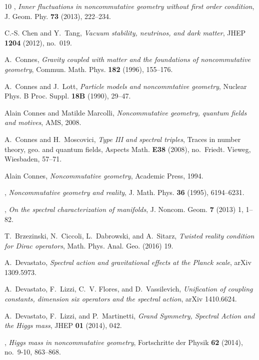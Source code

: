 \documentclass[11pt]{article}
\begin{document}
\begin{thebibliography}{10}
\bysame, \emph{{I}nner fluctuations in noncommutative geometry without first
  order condition}, J. Geom. Phy. \textbf{73} (2013), 222--234.


C.-S. Chen and Y.~Tang, \emph{Vacuum stability, neutrinos, and dark matter},
  JHEP \textbf{1204} (2012), no.~019.

A.~Connes, \emph{Gravity coupled with matter and the foundations of
  noncommutative geometry}, Commun. Math. Phys. \textbf{182} (1996), 155--176.

A.~Connes and J.~Lott, \emph{Particle models and noncommtative geometry},
  Nuclear Phys. B Proc. Suppl. \textbf{18B} (1990), 29--47.

Alain Connes and Matilde Marcolli, \emph{Noncommutative geometry, quantum
  fields and motives}, AMS, 2008.

A.~Connes and H.~Moscovici, \emph{Type {III} and spectral triples}, Traces in
  number theory, geo. and quantum fields, Aspects Math. \textbf{E38}
  (2008), no.~Friedt. Vieweg, Wiesbaden, 57--71.

Alain Connes, \emph{Noncommutative geometry}, Academic Press, 1994.

\bysame, \emph{Noncommutative geometry and reality}, J. Math. Phys. \textbf{36}
  (1995), 6194--6231.

\bysame, \emph{On the spectral characterization of manifolds}, J. Noncom. Geom.
  \textbf{7} (2013) 1, 1--82.

T.~Brzezinski, N.~Ciccoli, L.~Dabrowski, and A.~Sitarz, \emph{Twisted reality
  condition for {D}irac operators}, Math. Phys. Anal. Geo. (2016) 19.

A.~Devastato, \emph{Spectral action and gravitational effects at the {P}lanck
  scale}, arXiv 1309.5973.

A.~Devastato, F.~Lizzi, C.~V. Flores, and D.~Vassilevich, \emph{Unification of
  coupling constants, dimension six operators and the spectral action}, arXiv
  1410.6624.

A.~Devastato, F.~Lizzi, and P.~Martinetti, \emph{{G}rand {S}ymmetry, {S}pectral
  {A}ction and the {H}iggs mass}, JHEP \textbf{01} (2014), 042.

\bysame, \emph{Higgs mass in noncommutative geometry}, Fortschritte der Physik
  \textbf{62} (2014), no.~9-10, 863--868.


\end{thebibliography}
\end{document}
